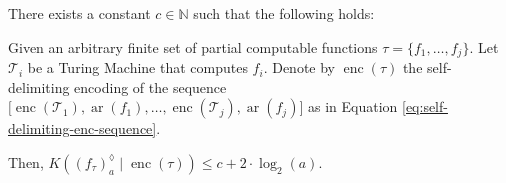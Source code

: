 
\begin{theorem}
	\label{theorem:recursive-completion-kolmogorov-complexity}
	There exists a constant $c\in\mathbb{N}$ such that the following holds:
	
	Given an arbitrary finite set of partial computable functions $\tau=\{f_1,\dots,f_j\}$. 
	Let $\mathcal{T}_{i}$ be a Turing Machine that computes $f_i$.
	Denote by $\operatorname{enc}(\tau)$ the self-delimiting encoding of the sequence $\bigl[\operatorname{enc}(\mathcal{T}_1),\operatorname{ar}(f_1),\dots,\operatorname{enc}(\mathcal{T}_j),\operatorname{ar}(f_j)\bigr]$ as in Equation \ref{eq:self-delimiting-enc-sequence}.
	
	Then, $K(\left(f_{\tau}\right)_{a}^{\lozenge}\mid \operatorname{enc}(\tau))\leq c+2\cdot \log_2(a)$.
	
\end{theorem}
